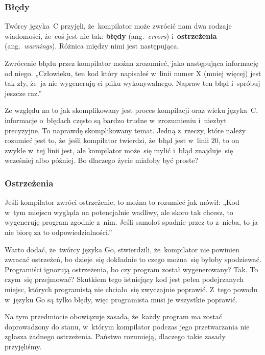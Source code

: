 \documentclass[10pt,t]{beamer}
\begin{document}
\begin{frame}
  \frametitle{Błędy}


  Twórcy języka~C przyjęli, że~kompilator może zwrócić nam dwa rodzaje
  wiadomości, że~coś jest nie tak: \textbf{błędy} (ang.~\textit{errors})
  i~\textbf{ostrzeżenia} (ang.~\textit{warnings}). Różnica między nimi
  jest następująca.

  Zwrócenie błędu przez kompilator można zrozumieć, jako następująca
  informację od niego. „Człowieku, ten kod który napisałeś w~linii
  numer X (mniej więcej) jest tak zły, że~ja nie wygenerują ci pliku
  wykonywalnego. Napraw ten błąd i~spróbuj jeszcze raz.”

  Ze względu na to jak skomplikowany jest proces kompilacji oraz wieku
  języka~C, informacje o~błędach często są bardzo trudne w~zrozumieniu
  i~niezbyt precyzyjne. To naprawdę skomplikowany temat. Jedną z~rzeczy,
  które należy rozumieć jest to, że~jeśli kompilator twierdzi, że~błąd
  jest w~linii $20$, to on zwykle w~tej linii jest, ale kompilator
  może~się mylić i~błąd znajduje~się wcześniej albo później. Bo dlaczego
  życie miałoby być proste?

\end{frame}





\begin{frame}
  \frametitle{Ostrzeżenia}


  Jeśli kompilator zwróci ostrzeżenie, to można to rozumieć jak mówił:
  „Kod w~tym miejscu wygląda na potencjalnie wadliwy, ale skoro tak chcesz,
  to wygeneruję program zgodnie z~nim. Jeśli samolot spadnie przez to
  z~nieba, to ja nie biorę za to odpowiedzialności.”

  Warto dodać, że~twórcy języka Go, stwierdzili, że~kompilator nie
  powinien zwracać ostrzeżeń, bo dzieje~się dokładnie to czego można~się
  byłoby spodziewać. Programiści ignorują ostrzeżenia, bo czy program został
  wygenerowany? Tak. To czym~się przejmować? Skutkiem tego istniejący
  kod jest pełen podejrzanych miejsc, których programistą nie chciało~się
  zwyczajnie poprawić. Z~tego powodu w~języku Go są tylko błędy, więc
  programista musi je wszystkie poprawić.

  Na tym przedmiocie obowiązuje zasada, że~każdy program ma zostać
  doprowadzony do stanu, w~którym kompilator podczas jego przetwarzania
  nie zgłasza żadnego ostrzeżenia. Państwo rozumieją, dlaczego takie zasady
  przyjęliśmy.

\end{frame}
\end{document}
